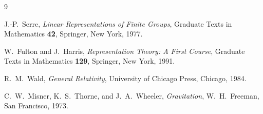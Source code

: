 \documentclass[11pt]{article}
\theoremstyle{plain}
\theoremstyle{remark}
\begin{document}
\begin{thebibliography}{9}

J.-P.\ Serre, \emph{Linear Representations of Finite Groups},
Graduate Texts in Mathematics \textbf{42}, Springer, New York, 1977.

W.\ Fulton and J.\ Harris, \emph{Representation Theory: A First Course},
Graduate Texts in Mathematics \textbf{129}, Springer, New York, 1991.

R.\ M.\ Wald, \emph{General Relativity},
University of Chicago Press, Chicago, 1984.

C.\ W.\ Misner, K.\ S.\ Thorne, and J.\ A.\ Wheeler, \emph{Gravitation},
W.\ H.\ Freeman, San Francisco, 1973.

\end{thebibliography}
\end{document}

